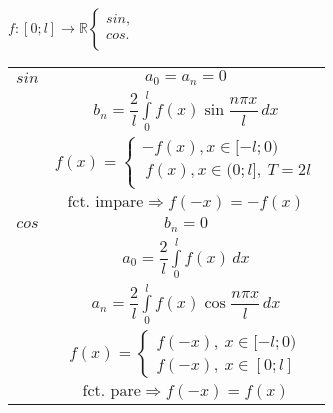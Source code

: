 \documentclass{article}
\begin{document}
$ f:[0; l] \rightarrow \mathbb{R} \begin{cases}
    sin, \\
    cos. \\
  \end{cases} $

\begin{tabular}{|c|c|}
  \hline
  $sin$ & $ a_0 = a_n = 0 $                                                                       \\

        & $ b_n = \dfrac{2}{l} \displaystyle\int\limits_{0}^{l} f(x) \sin \dfrac{n\pi x}{l}\,dx $ \\

        & $ f(x) = \begin{cases}
                       -f(x), x \in [-l; 0)          \\
                       \ f(x), x \in (0; l],\ T = 2l \\
                     \end{cases}$                                                  \\
        & $ \text{fct. impare} \Rightarrow f(-x) = -f(x)$                                         \\
  \hline
  $cos$ & $ b_n = 0 $                                                                             \\
        & $ a_0 = \dfrac{2}{l} \displaystyle\int\limits_{0}^{l} f(x)\,dx $                        \\
        & $ a_n = \dfrac{2}{l} \displaystyle\int\limits_{0}^{l} f(x) \cos \dfrac{n\pi x}{l}\,dx $ \\
        & $ f(x) = \begin{cases}
                       f(-x),\ x \in [-l; 0) \\
                       f(-x),\ x \in [0; l]
                     \end{cases}$                                                          \\
        & $ \text{fct. pare} \Rightarrow f(-x) = f(x)$                                            \\
  \hline
\end{tabular}
\end{document}
